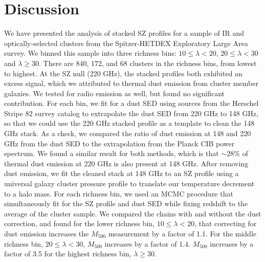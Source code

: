 \documentclass[a4paper,fleqn,usenatbib]{mnras}
\begin{document}
\section{Discussion} \label{sec:conclusions}
We have presented the analysis of stacked SZ profiles for a sample of IR and optically-selected clusters from the Spitzer-HETDEX Exploratory Large Area survey. We binned this sample into three richness bins: $10 \leq \lambda < 20$, $20 \leq \lambda < 30$ and $\lambda \geq 30$. There are 840, 172, and 68 clusters in the richness bins, from lowest to highest. 
At the SZ null (220 GHz), the stacked profiles both exhibited an excess signal, which we attributed to thermal dust emission from cluster member galaxies. We tested for radio emission as well, but found no significant contribution.  For each bin, we fit for a dust SED using sources from the Herschel Stripe 82 survey catalog to extrapolate the dust SED from 220 GHz to 148 GHz, so that we could use the 220 GHz stacked profile as a template to clean the 148 GHz stack. As a check, we compared the ratio of dust emission at 148 and 220 GHz from the dust SED to the extrapolation from the Planck CIB power spectrum. We found a similar result for both methods, which is that $\sim28\%$ of thermal dust emission at 220 GHz is also present at 148 GHz. 
After removing dust emission, we fit the cleaned stack at 148 GHz to an SZ profile using a universal galaxy cluster pressure profile to translate our temperature decrement to a halo mass. For each richness bin, we used an MCMC procedure that simultaneously fit for the SZ profile and dust SED while fixing redshift to the average of the cluster sample.  We compared the chains with and without the dust correction, and found for the lower richness bin, $10 \leq \lambda < 20$, that correcting for dust emission increases the $M_{500}$ measurement by a factor of 1.1. For the middle richness bin, $20 \leq \lambda < 30$, $M_{500}$ increases by a factor of 1.4. $M_{500}$ increases by a factor of 3.5 for the highest richness bin, $\lambda \geq 30$.
\end{document}

